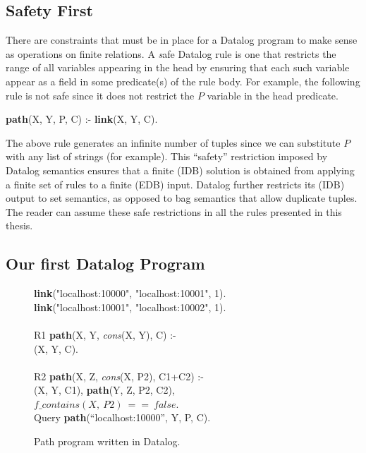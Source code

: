\subsection{Safety First}

There are constraints that must be in place for a Datalog program to make sense
as operations on finite relations.  A {\emph safe} Datalog rule is one that
restricts the range of all variables appearing in the head by ensuring that
each such variable appear as a field in some predicate(s) of the rule body.
For example, the following rule is not safe since it does not restrict the $P$
variable in the  head predicate.

\begin{minipage}{\linewidth}
\ssp
{\bf path}(X, Y, P, C) :- {\bf link}(X, Y, C). \\
\end{minipage}
The above rule generates an infinite number of  tuples since we can
substitute $P$ with any list of strings (for example).  This ``safety''
restriction imposed by Datalog semantics ensures that a finite (IDB) solution is
obtained from applying a finite set of rules to a finite (EDB) input.  Datalog
further restricts its (IDB) output to set semantics, as opposed to bag
semantics that allow duplicate tuples.  The reader can assume these safe restrictions
in all the rules presented in this thesis.

\subsection{Our first Datalog Program}

\begin{figure}
\ssp
\begin{boxedminipage}{\linewidth}
{\bf link}("localhost:10000", "localhost:10001", 1). \\
{\bf link}("localhost:10001", "localhost:10002", 1). \\
\\
R1 {\bf path}(X, Y, {\em cons}(X, Y), C) :- \\
(X, Y, C). \\
\\       
R2 {\bf path}(X, Z, {\em cons}(X, P2), C1+C2) :- \\
(X, Y, C1), {\bf path}(Y, Z, P2, C2), \\
\datalogspace $f\_contains(X,\ P2)\ ==\ false$. \\

Query {\bf path}(``localhost:10000'', Y, P, C).
\end{boxedminipage}
\caption{\label{ch:p2:fig:datalogPath}Path program written in Datalog.}
\end{figure}

